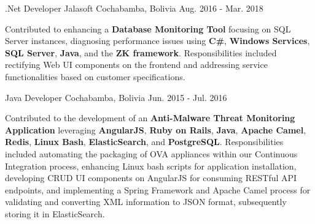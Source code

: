 \begin{cventries}
{\begin{cvitems}
      \end{cvitems} 
    }
  \cventry
    {.Net Developer}
    {Jalasoft}
    {Cochabamba, Bolivia}
    {Aug. 2016 - Mar. 2018}
    {
      \begin{cvitems}
        \item {Contributed to enhancing a \textbf{Database Monitoring Tool} focusing on SQL Server instances, diagnosing performance issues using \textbf{C\#}, \textbf{Windows Services}, \textbf{SQL Server}, \textbf{Java}, and the \textbf{ZK framework}. Responsibilities included rectifying Web UI components on the frontend and addressing service functionalities based on customer specifications.}
      \end{cvitems} 
    }
  \cventry
    {Java Developer}
    {}
    {Cochabamba, Bolivia}
    {Jun. 2015 - Jul. 2016}
    {
      \begin{cvitems}
        \item {Contributed to the development of an \textbf{Anti-Malware Threat Monitoring Application} leveraging \textbf{AngularJS}, \textbf{Ruby on Rails}, \textbf{Java}, \textbf{Apache Camel}, \textbf{Redis}, \textbf{Linux Bash}, \textbf{ElasticSearch}, and \textbf{PostgreSQL}. Responsibilities included automating the packaging of OVA appliances within our Continuous Integration process, enhancing Linux bash scripts for application installation, developing CRUD UI components on AngularJS for consuming RESTful API endpoints, and implementing a Spring Framework and Apache Camel process for validating and converting XML information to JSON format, subsequently storing it in ElasticSearch.}
      \end{cvitems}
    }


\end{cventries}
